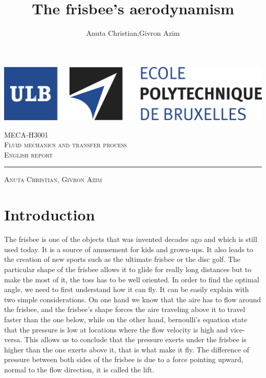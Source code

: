 \documentclass[10pt,a4paper]{report}
\author{Anuta Christian,Givron Azim}
\title{The frisbee's aerodynamism}
\begin{document}
\begin{titlepage}

\includegraphics[scale=0.5]{logo-polytech-ULB-FR.jpg}

\center 
\vspace{5cm}
\textsc{\large MECA-H3001} \\[0.5cm]
\textsc{\LARGE Fluid mechanics and transfer process} \\[1.5cm]
\textsc{\Large English report} %

\rule{\textwidth}{1pt}

\vspace{2cm}

\textsc{\large Anuta Christian, Givron Azim}

\end{titlepage}



\tableofcontents
\newpage 
\listoffigures
\newpage
\section{Introduction}
The frisbee is one of the objects that was invented decades ago and which is still used today. It is a source of amusement for kids and grown-ups. It also leads to the creation of new sports such as the ultimate frisbee or the disc golf. The particular shape of the frisbee allows it to glide for really long distances but to make the most of it, the toss has to be well oriented. In order to find the optimal angle, we need to first understand how it can fly. It can be easily explain with two simple considerations. On one hand we know that the aire has to flow around the frisbee, and the frisbee's shape forces the aire traveling above it to travel faster than the one below, while on the other hand, bernoulli's equation state that the pressure is low at locations where the flow velocity is high and vice-versa. This allows us to conclude that the pressure exerts under the frisbee is higher than the one exerts above it, that is what make it fly. The difference of pressure between both sides of the frisbee is due to a force pointing upward, normal to the flow direction, it is called the lift. 
\end{document}
